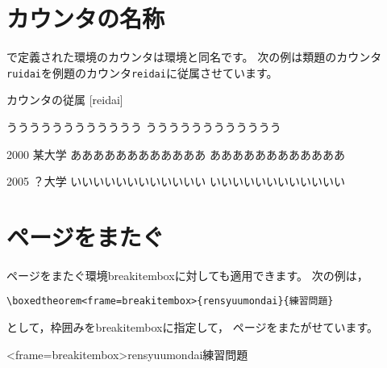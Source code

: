 \documentclass[a4j]{jarticle}
\begin{document}
\section{カウンタの名称}
で定義された環境のカウンタは環境と同名です。
次の例は類題のカウンタ\texttt{ruidai}を例題のカウンタ\texttt{reidai}に従属させています。

\begin{showEx}{カウンタの従属}
[reidai]
\def\theruidai{%
  \arabic{reidai}.\arabic{ruidai}}
\begin{reidai}
うううううううううううう
うううううううううううう
\end{reidai}

\begin{ruidai}{2000 某大学}
ああああああああああああ
ああああああああああああ
\end{ruidai}

\begin{ruidai}{2005 ？大学}
いいいいいいいいいいいい
いいいいいいいいいいいい
\end{ruidai}
\end{showEx}

\section{ページをまたぐ}
ページをまたぐ環境\textsf{breakitembox}に対しても適用できます。
次の例は，

\begin{jquote}
\begin{verbatim}
\boxedtheorem<frame=breakitembox>{rensyuumondai}{練習問題}
\end{verbatim}
\end{jquote}
として，枠囲みを\textsf{breakitembox}に指定して，
ページをまたがせています。

\boxedtheorem<frame=breakitembox>{rensyuumondai}{練習問題}
\end{document}
